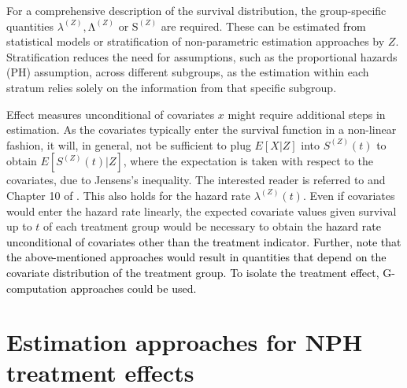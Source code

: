 \documentclass{article}
\newcommand{\NEW}[2][black]{\textcolor{#1}{#2}}
\begin{document}
\noindent For a comprehensive description of the survival distribution, the group-specific quantities ${\lambda }^{\left(Z\right)},{\mathrm{\Lambda }}^{\left(Z\right)}$ or ${\mathrm{S}}^{\left(Z\right)}$ are required. These can be estimated \NEW{from} statistical models or stratification of non-parametric estimation approaches by $Z$. %
Stratification reduces the need for assumptions, such as the proportional hazards (PH) assumption, across different subgroups, as the estimation within each stratum relies solely on the information from that specific subgroup.

\noindent Effect measures unconditional of covariates $x$ might require additional steps in estimation. As the covariates typically enter the survival function in a non-linear fashion, it will, in general, not be sufficient to plug $E[X|Z]$ into $S^{\left(Z\right)}\left(t\right)$ to obtain $E[S^{\left(Z\right)}\left(t\right)|Z]$, where the expectation is taken with respect to the covariates, due to Jensens's inequality. The interested reader is referred to \cite{Keiding.2005} and Chapter 10 of \cite{Therneau.2013}. This also holds for the hazard rate ${\lambda }^{\left(Z\right)}(t)$. Even if covariates would enter the hazard rate linearly, the expected covariate values given survival up to $t$ of each treatment group would be necessary to obtain the \NEW{hazard rate unconditional of covariates other than the treatment indicator.
Further, note that the above-mentioned approaches would result in quantities that depend on the covariate distribution of the treatment group. To isolate the treatment effect, G-computation approaches could be used.}\\ %

\noindent 


\section{Estimation approaches for NPH treatment effects}\label{estimation}
\end{document}
